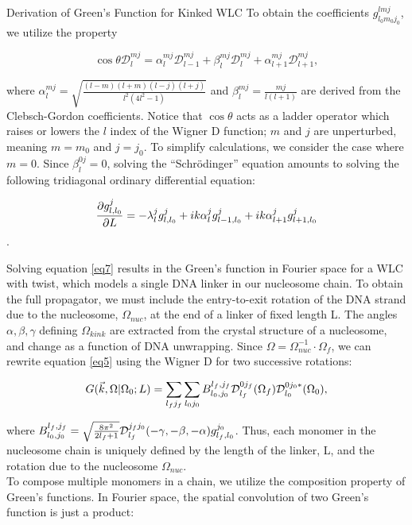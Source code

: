 \documentclass[11pt]{article}
\begin{document}
\begin{flushleft}
\begin{section}{Derivation of Green's Function for Kinked WLC}
To obtain the coefficients $g_{l_0m_0j_0}^{lmj}$, we utilize the property

 \begin{equation}\label{eq6}
    \cos{\theta}{\mathcal{D}}^{mj}_{l} = \alpha^{mj}_{l}{\mathcal{D}}^{mj}_{l-1} +
    \beta^{mj}_{l}{\mathcal{D}}^{mj}_{l} + \alpha^{mj}_{l+1}{\mathcal{D}}^{mj}_{l+1},
    \end{equation}

where $\alpha^{mj}_{l}=\sqrt{\frac{(l-m)(l+m)(l-j)(l+j)}{l^2(4l^2-1)}}$ and $\beta^{mj}_{l}=\frac{mj}{l(l+1)}$ are derived from the Clebsch-Gordon coefficients. Notice that $\cos\theta$ acts as a ladder operator which raises or lowers the $l$ index of the Wigner D function; $m$ and $j$ are unperturbed, meaning $m=m_0$ and $j=j_0$. To simplify calculations, we consider the case where $m=0$. Since $\beta^{0j}_{l}=0$, solving the ``Schrödinger'' equation amounts to solving the following tridiagonal ordinary differential equation:

 \begin{equation}\label{eq7}
\frac{\partial \gcoeff{l}}{\partial L} = -\lambda_l^j\gcoeff{l} + ik\alpha_{l}^{j}\gcoeff{l-1} + ik\alpha_{l+1}^{j}\gcoeff{l+1}
 \end{equation}.


Solving equation \ref{eq7} results in the Green's function in Fourier space for a WLC with twist, which models a single DNA linker in our nucleosome chain. To obtain the full propagator, we must include the entry-to-exit rotation of the DNA strand due to the nucleosome, $\Omega_{nuc}$, at the end of a linker of fixed length L.
The angles $\alpha, \beta, \gamma$ defining $\Omega_{kink}$ are extracted from the crystal structure of a nucleosome, and change as a function of DNA unwrapping. Since $\Omega = \Omega_{nuc}^{-1}\cdot\Omega_f$, we can rewrite equation \ref{eq5} using the Wigner D for two successive rotations:

\begin{equation}\label{eq8}
\greensk = {\sum_{l_fj_f}\sum_{l_0j_0}B_{l_0,j_0}^{l_f,j_f}\wigD{l_f}{0}{j_f}(\Omega_f)\wigD{l_0}{0}{j_0*}(\Omega_0)},
\end{equation}

where $B_{l_0,j_0}^{l_f,j_f} = \sqrt{\frac{8\pi^2}{2l_f+1}}\wigD{l_f}{j_f}{j_0}(-\gamma,-\beta,-\alpha)g_{l_f,l_0}^{j_0}$. Thus, each monomer in the nucleosome chain is uniquely defined by the length of the linker, L, and the rotation due to the nucleosome $\Omega_{nuc}$.\\
\vspace{\baselineskip}
To compose multiple monomers in a chain, we utilize the composition property of Green's functions. In Fourier space, the spatial convolution of two Green's function is just a product:


\end{section}
\end{flushleft}
\end{document}
